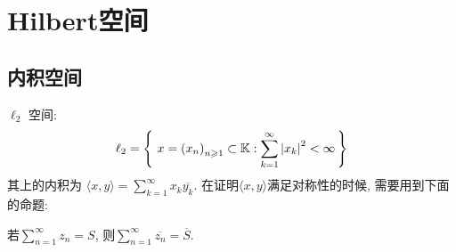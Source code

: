 \chapter{Hilbert空间}
\section{内积空间}
\begin{detail}{66}{$\ell_{2}$ 空间:
    \[
    \ell_{2}=\set{x=\left(x_{n}\right)_{n \geqslant 1} \subset \mathbb{K}}{\sum_{k=1}^{\infty}\left|x_{k}\right|^{2}<\infty}
    \]
    其上的内积为 $\langle x, y\rangle=\sum_{k=1}^{\infty} x_{k} \overline{y_{k}}$.}
    在证明$\langle x, y\rangle$满足对称性的时候, 需要用到下面的命题: 
    \begin{proposition}
        若$\sum_{n=1}^{\infty} z_{n}=S$, 则$\sum_{n=1}^{\infty} \overline{z_{n}}=\overline{S}$.
    \end{proposition}
\end{detail}

